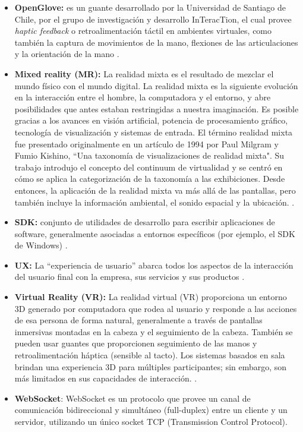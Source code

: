{\begin{itemize}
\item  \textbf{OpenGlove:} es un guante desarrollado por la Universidad de Santiago de Chile, por el grupo de investigación y desarrollo InTeracTion, el cual provee \textit{haptic feedback} o retroalimentación táctil en ambientes virtuales, como también la captura de movimientos de la mano, flexiones de las articulaciones y la orientación de la mano \citep{openglove-info-page}.

\item \textbf{Mixed reality (MR):}  La realidad mixta es el resultado de mezclar el mundo físico con el mundo digital. La realidad mixta es la siguiente evolución en la interacción entre el hombre, la computadora y el entorno, y abre posibilidades que antes estaban restringidas a nuestra imaginación. Es posible gracias a los avances en visión artificial, potencia de procesamiento gráfico, tecnología de visualización y sistemas de entrada. El término realidad mixta fue presentado originalmente en un artículo de 1994 por Paul Milgram y Fumio Kishino, ``Una taxonomía de visualizaciones de realidad mixta". Su trabajo introdujo el concepto del continuum de virtualidad y se centró en cómo se aplica la categorización de la taxonomía a las exhibiciones. Desde entonces, la aplicación de la realidad mixta va más allá de las pantallas, pero también incluye la información ambiental, el sonido espacial y la ubicación. \citep{microsoft-MR}.

\item \textbf{SDK:} conjunto de utilidades de desarrollo para escribir aplicaciones de software, generalmente asociadas a entornos específicos (por ejemplo, el SDK de Windows) \citep{gartner-group-SDK}.

\item \textbf{UX:}	La ``experiencia de usuario'' abarca todos los aspectos de la interacción del usuario final con la empresa, sus servicios y sus productos \citep{nngroup-ux}.

\item \textbf{Virtual Reality (VR):}  La realidad virtual (VR) proporciona un entorno 3D generado por computadora que rodea al usuario y responde a las acciones de esa persona de forma natural, generalmente a través de pantallas inmersivas montadas en la cabeza y el seguimiento de la cabeza. También se pueden usar guantes que proporcionen seguimiento de las manos y retroalimentación háptica (sensible al tacto). Los sistemas basados en sala brindan una experiencia 3D para múltiples participantes; sin embargo, son más limitados en sus capacidades de interacción. \citep{gartner-group-VR}.

\item \textbf{WebSocket}: WebSocket es un protocolo que provee un canal de comunicación bidireccional y simultáneo (full-duplex) entre un cliente y un servidor, utilizando un único socket TCP (Transmission Control Protocol). \citep{websocket-html5}

\end{itemize}

}